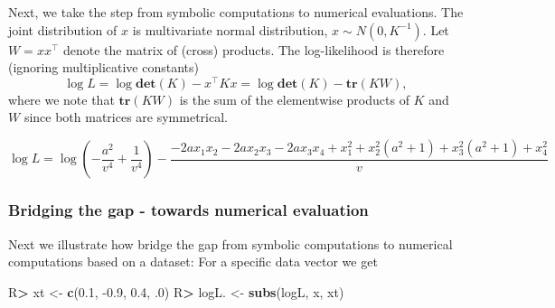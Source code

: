\documentclass[10pt,]{article}
\newenvironment{Shaded}{\begin{snugshade}}{\end{snugshade}}
\newcommand{\FloatTok}[1]{\textcolor[rgb]{0.00,0.00,0.81}{#1}}
\newcommand{\KeywordTok}[1]{\textcolor[rgb]{0.13,0.29,0.53}{\textbf{#1}}}
\newcommand{\NormalTok}[1]{#1}
\newcommand{\OperatorTok}[1]{\textcolor[rgb]{0.81,0.36,0.00}{\textbf{#1}}}
\newcommand{\StringTok}[1]{\textcolor[rgb]{0.31,0.60,0.02}{#1}}
\begin{document}
Next, we take the step from symbolic computations to numerical
evaluations. The joint distribution of \(x\) is multivariate normal
distribution, \(x\sim N(0, K^{-1})\). Let \(W=x x^\top\) denote the
matrix of (cross) products. The log-likelihood is therefore (ignoring
multiplicative constants) \[ 
\log L = \log \mathbf{det}(K) - x^\top K x = \log \mathbf{det}(K) - \mathbf{tr}(K W), 
\] where we note that \(\mathbf{tr}(KW)\) is the sum of the elementwise
products of \(K\) and \(W\) since both matrices are symmetrical.

\begin{Shaded}
\end{Shaded}

\[
\log L = \log{\left(- \frac{a^{2}}{v^{4}} + \frac{1}{v^{4}} \right)} - \frac{- 2 a x_{1} x_{2} - 2 a x_{2} x_{3} - 2 a x_{3} x_{4} + x_{1}^{2} + x_{2}^{2} \left(a^{2} + 1\right) + x_{3}^{2} \left(a^{2} + 1\right) + x_{4}^{2}}{v}
\]

\hypertarget{bridging-the-gap---towards-numerical-evaluation}{%
\subsubsection{Bridging the gap - towards numerical
evaluation}\label{bridging-the-gap---towards-numerical-evaluation}}

Next we illustrate how bridge the gap from symbolic computations to
numerical computations based on a dataset: For a specific data vector we
get

\begin{Shaded}
\begin{Highlighting}[]
\NormalTok{R}\OperatorTok{>}\StringTok{ }\NormalTok{xt <-}\StringTok{ }\KeywordTok{c}\NormalTok{(}\FloatTok{0.1}\NormalTok{, }\FloatTok{-0.9}\NormalTok{, }\FloatTok{0.4}\NormalTok{, }\FloatTok{.0}\NormalTok{)}
\NormalTok{R}\OperatorTok{>}\StringTok{ }\NormalTok{logL. <-}\StringTok{ }\KeywordTok{subs}\NormalTok{(logL, x, xt) }
\end{Highlighting}
\end{Shaded}
\end{document}

